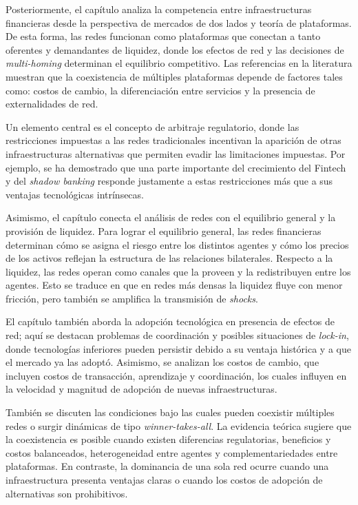 \documentclass[12pt,a4paper]{article}
\begin{document}
Posteriormente, el capítulo analiza la competencia entre infraestructuras financieras desde la
perspectiva de mercados de dos lados y teoría de plataformas. De esta forma, las redes
funcionan como plataformas que conectan a tanto oferentes y demandantes de liquidez, donde
los efectos de red y las decisiones de \textit{multi-homing} determinan el equilibrio competitivo.
Las referencias en la literatura muestran que la coexistencia de múltiples plataformas depende
de factores tales como: costos de cambio, la diferenciación entre servicios y la presencia de
externalidades de red.

Un elemento central es el concepto de arbitraje regulatorio, donde las restricciones impuestas
a las redes tradicionales incentivan la aparición de otras infraestructuras alternativas que
permiten evadir las limitaciones impuestas. Por ejemplo, se ha demostrado que una parte
importante del crecimiento del Fintech y del \textit{shadow banking} responde justamente a
estas restricciones más que a sus ventajas tecnológicas intrínsecas.

Asimismo, el capítulo conecta el análisis de redes con el equilibrio general y la provisión de
liquidez. Para lograr el equilibrio general, las redes financieras determinan cómo se asigna el
riesgo entre los distintos agentes y cómo los precios de los activos reflejan la estructura de
las relaciones bilaterales. Respecto a la liquidez, las redes operan como canales que la proveen
y la redistribuyen entre los agentes. Esto se traduce en que en redes más densas la liquidez
fluye con menor fricción, pero también se amplifica la transmisión de \textit{shocks}.

El capítulo también aborda la adopción tecnológica en presencia de efectos de red; aquí se
destacan problemas de coordinación y posibles situaciones de \textit{lock-in}, donde
tecnologías inferiores pueden persistir debido a su ventaja histórica y a que el mercado ya las
adoptó. Asimismo, se analizan los costos de cambio, que incluyen costos de transacción,
aprendizaje y coordinación, los cuales influyen en la velocidad y magnitud de adopción de
nuevas infraestructuras.

También se discuten las condiciones bajo las cuales pueden coexistir múltiples redes o surgir
dinámicas de tipo \textit{winner-takes-all}. La evidencia teórica sugiere que la coexistencia
es posible cuando existen diferencias regulatorias, beneficios y costos balanceados,
heterogeneidad entre agentes y complementariedades entre plataformas. En contraste, la
dominancia de una sola red ocurre cuando una infraestructura presenta ventajas claras o
cuando los costos de adopción de alternativas son prohibitivos.
\end{document}
